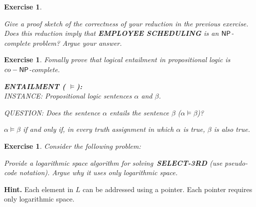 \documentclass [11pt]{article}
\newtheorem{exercise}[theorem]{Exercise}
\newcommand{\ccfont}[1]{\protect\mathsf{#1}}
\newcommand{\NP}{\ccfont{NP}}
\newcommand{\solution}[1]{\noindent {\bf Solution.}  #1}
\begin{document}


\begin{exercise}

  \label{ex:Scheduling2}

  Give a proof sketch of the correctness of your reduction in the previous exercise. Does this reduction imply that \textbf{EMPLOYEE SCHEDULING} is an $\NP$-complete problem? Argue your answer.  
   
\end{exercise}





\begin{exercise}
  \label{ex:CO-NP}
Fomally prove that logical entailment in propositional logic is $co-\NP$-complete. 
 
\medskip   
\noindent 
\textbf{ENTAILMENT ( $\models$):} \\
\noindent 
INSTANCE: Propositional logic sentences $\alpha$ and $\beta$. 

\noindent 
QUESTION: Does the sentence $\alpha$ entails the sentence $\beta$  ($\alpha \models \beta$)? 

\medskip

\noindent $\alpha \models \beta$ if and only if, in every truth assignment in which $\alpha$ is true, $\beta$ is also true.    

  
  
\end{exercise}

\newpage

\begin{exercise}
  Consider the following problem:

  \begin{center}
  \end{center}


  \medskip Provide a logarithmic space algorithm for
  solving~\textbf{SELECT-3RD} (use pseudo-code notation). Argue why it
  uses only logarithmic space.
\end{exercise}
\noindent \textbf{Hint.} Each element in $L$ can be addressed using a
pointer. Each pointer requires only logarithmic space.
\end{document}

